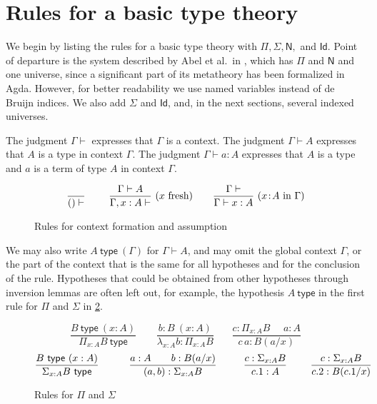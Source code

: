 \documentclass[11pt,a4paper]{article}
\theoremstyle{definition}
\newcommand{\Id}{\mathsf{Id}}
\newcommand{\NN}{\mathsf{N}}
\newcommand{\type}{\mathsf{type}}
\newcommand{\mypi}[3]{\Pi_{#1:#2}#3}
\newcommand{\mylam}[3]{\lambda_{#1:#2}#3}
\newcommand{\app}[2]{{#1\,#2}} %
\newcommand{\mysig}[3]{\Sigma_{#1:#2}#3}
\begin{document}
\section{Rules for a basic type theory}

We begin by listing the rules for a basic type theory
with $\Pi, \Sigma, \NN,$ and $\Id$. Point of departure is
the system described by Abel et al.\ in \cite{abel18},
which has $\Pi$ and $\NN$ and one universe, since a
significant part of its metatheory has been formalized in Agda.
However, for better readability we use named variables instead
of de Bruijn indices. We also add $\Sigma$ and $\Id$, and,
in the next sections, several indexed universes.

The judgment $\Gamma\vdash$ expresses that $\Gamma$ is a context.
The judgment $\Gamma\vdash A$ expresses that $A$ is a type in context $\Gamma$.
The judgment $\Gamma\vdash a:A$ expresses that $A$ is a type
and $a$ is a term of type $A$ in context $\Gamma$.

\begin{figure}[h]
  \caption{Rules for context formation and assumption}\label{fig:context}
$$
\frac{}{()\vdash}~~~~~~~
\frac{\Gamma\vdash A}{\Gamma,x:A\vdash}~(x~\text{fresh})~~~~~~
\frac{\Gamma\vdash}{\Gamma\vdash x:A}~(x\!:\! A~\text{in}~\Gamma)
\belowdisplayshortskip 0pt
$$
\end{figure}

We may also write $A~\type~(\Gamma)$ for $\Gamma\vdash A$,
and may omit the global context $\Gamma$,
or the part of the context that is the same for all hypotheses and for the
conclusion of the rule.
Hypotheses that could be obtained from other
hypotheses through inversion lemmas are often left out,
for example, the hypothesis $A~\type$ in the first rule for $\Pi$ and $\Sigma$
in \cref{fig:PiSig}.

\begin{figure}[h]
  \caption{Rules for $\Pi$ and $\Sigma$}\label{fig:PiSig}
$$
\frac{B~\type~(x:A)}{\mypi{x}{A}{B}~\type}~~~~~~~~~
\frac{b:B~(x:A)}{\mylam{x}{A}{b}:\mypi{x}{A}{B}}~~~~~~~~
\frac{c:\mypi{x}{A}{B}~~~~~~a:A}
     {\app{c}{a}:B(a/x)}
$$
$$
\frac{B~\type~(x:A)}{\mysig{x}{A}{B}~\type}~~~~~~~~~
\frac{a:A~~~~~~b:B(a/x)}{(a,b):\mysig{x}{A}{B}}~~~~~~~~
\frac{c:\mysig{x}{A}{B}}{c.1:A}~~~~~~~
\frac{c:\mysig{x}{A}{B}}{c.2:B(c.1/x)}
\belowdisplayshortskip -1pt
$$
\end{figure}
\end{document}
